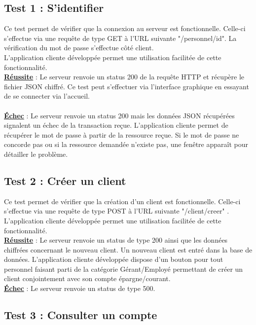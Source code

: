 \subsection{Test 1 : S'identifier}

Ce test permet de vérifier que la connexion au serveur est fonctionnelle.
Celle-ci s'effectue via une requête de type GET à l'URL suivante "/personnel/{id}".
La vérification du mot de passe s'effectue côté client. 
\\
L'application cliente développée permet une utilisation facilitée de cette fonctionnalité. 
\\
\textbf{\underline{Réussite}} : Le serveur renvoie un status 200 de la requête HTTP et récupère le fichier JSON chiffré. Ce test peut s'effectuer via l'interface graphique en essayant de se connecter via l'accueil.\\
\\
\textbf{\underline{Échec}} : Le serveur renvoie un status 200 mais les données JSON récupérées signalent un échec de la transaction reçue.
L'application cliente permet de récupérer le mot de passe à partir de la ressource reçue. Si le mot de passe ne concorde pas ou si la ressource demandée n'existe pas, une fenêtre apparaît pour détailler le problème.

\subsection{Test 2 : Créer un client}

Ce test permet de vérifier que la création d'un client est fonctionnelle.
Celle-ci s'effectue via une requête de type POST à l'URL suivante "/client/creer" .
\\
L'application cliente développée permet une utilisation facilitée de cette fonctionnalité. 
\\
\textbf{\underline{Réussite}} : Le serveur renvoie un status de type 200 ainsi que les données chiffrées concernant le nouveau client. Un nouveau client est entré dans la base de données.
L'application cliente développée dispose d'un bouton pour tout personnel faisant parti de la catégorie Gérant/Employé permettant de créer un client conjointement avec son compte épargne/courant.
\\
\textbf{\underline{Échec}} : Le serveur renvoie un status de type 500.

\subsection{Test 3 : Consulter un compte}

